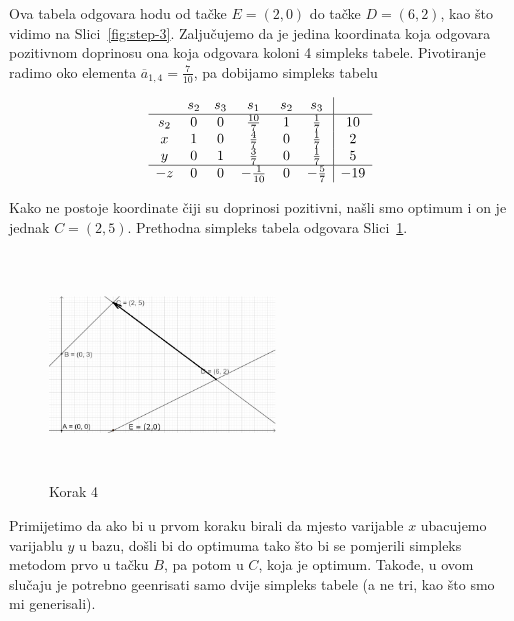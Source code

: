 \documentclass[a4paper, utf8, 11pt, colorlinks]{article}
\begin{document}
Ova tabela odgovara hodu od tačke $E=(2,0)$ do tačke $D=(6,2)$, kao što vidimo na Slici~\ref{fig:step-3}.
Zaljučujemo da je jedina koordinata koja odgovara pozitivnom doprinosu ona koja odgovara koloni 
4 simpleks tabele. Pivotiranje radimo oko elementa $\overline{a}_{1,4} = \frac{7}{10}$, pa dobijamo simpleks tabelu 

$$\begin{array}{cccccc| c}
	& s_2  & s_3   & s_1  & s_2 & s_3 &     \\ \hline
s_2 &  0   &  0    & \frac{10}{7}    &  1   & \frac{1}{7}   & 10 \\
x   &  1   &  0    &  \frac{4}{7}    &  0   & \frac{1}{7}  & 2 \\
y   &  0   &  1    &  \frac{3}{7}    &  0   & \frac{1}{7}   & 5  \\ \hline
-z  &  0   &  0   &   -\frac{1}{10}  & 0    &  -\frac{5}{7} & -19 \\
\end{array}
$$ 

Kako ne postoje koordinate čiji su doprinosi pozitivni, našli smo optimum i on je jednak 
$C=(2,5)$. Prethodna simpleks tabela odgovara Slici~\ref{fig:step-4}.  

\begin{figure}[H]
	\centering
	\includegraphics[width=170pt, height=170pt]{simpleks-primjer-2-sl4.eps}
	\caption{Korak 4}
	\label{fig:step-4}
\end{figure}


Primijetimo da ako bi u prvom koraku birali da mjesto varijable $x$ ubacujemo varijablu $y$ u bazu, došli bi do optimuma tako što bi se pomjerili simpleks metodom prvo u tačku $B$, pa potom u $C$, koja je optimum. Takođe, u ovom slučaju je potrebno geenrisati samo dvije simpleks tabele (a ne tri, kao što smo mi generisali).
\end{document}
